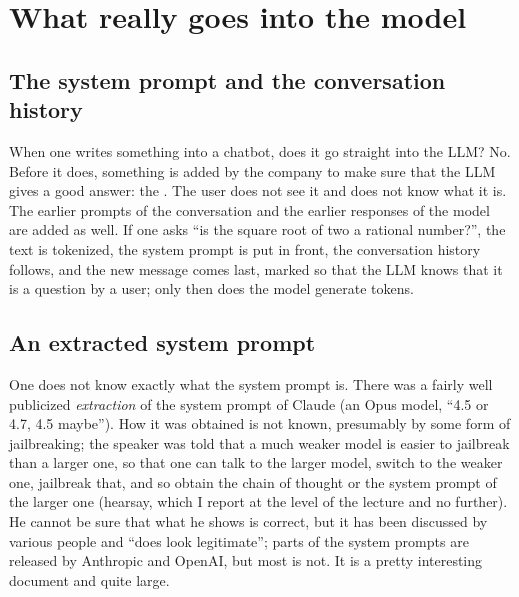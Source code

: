 
\section{What really goes into the model}\label{sec:L6-prompt}
\subsection{The system prompt and the conversation history}\label{sec:L6-system}
When one writes something into a chatbot, does it go straight into the LLM? No. Before it does, something is added by the company to make sure that the LLM gives a good answer: the . The user does not see it and does not know what it is. The earlier prompts of the conversation and the earlier responses of the model are added as well. If one asks ``is the square root of two a rational number?'', the text is tokenized, the system prompt is put in front, the conversation history follows, and the new message comes last, marked so that the LLM knows that it is a question by a user; only then does the model generate tokens.

\subsection{An extracted system prompt}\label{sec:L6-extracted}
One does not know exactly what the system prompt is. There was a fairly well publicized \emph{extraction} of the system prompt of Claude (an Opus model, ``4.5 or 4.7, 4.5 maybe''\flag). How it was obtained is not known, presumably by some form of jailbreaking; the speaker was told that a much weaker model is easier to jailbreak than a larger one, so that one can talk to the larger model, switch to the weaker one, jailbreak that, and so obtain the chain of thought or the system prompt of the larger one (hearsay, which I report at the level of the lecture and no further). He cannot be sure that what he shows is correct, but it has been discussed by various people and ``does look legitimate''; parts of the system prompts are released by Anthropic and OpenAI, but most is not. It is a pretty interesting document and quite large.

